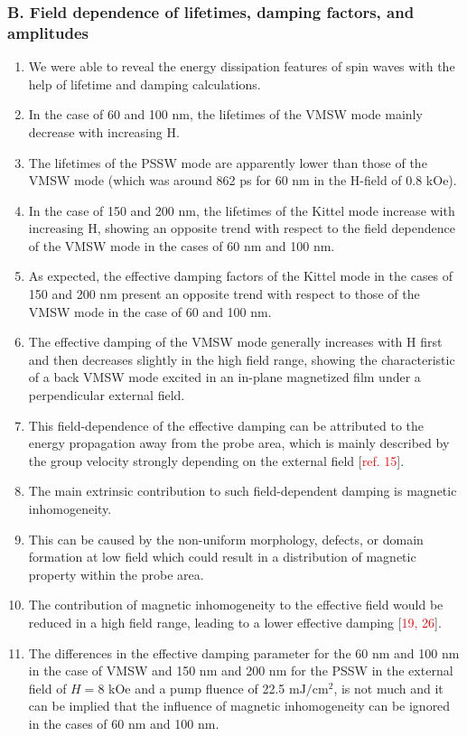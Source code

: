 \subsubsection*{B. Field dependence of lifetimes, damping factors, and amplitudes}
\begin{enumerate}
    \item We were able to reveal the energy dissipation features of spin waves with the help of lifetime and damping calculations.
    \item In the case of 60 and 100 nm, the lifetimes of the VMSW mode mainly decrease with increasing H.
    \item The lifetimes of the PSSW mode are apparently lower than those of the VMSW mode (which was around 862 ps for 60 nm in the H-field of 0.8 kOe).
    \item In the case of 150 and 200 nm, the lifetimes of the Kittel mode increase with increasing H, showing an opposite trend with respect to the field dependence of the VMSW mode in the cases of 60 nm and 100 nm.
    \item As expected, the effective damping factors of the Kittel mode in the cases of 150 and 200 nm present an opposite trend with respect to those of the VMSW mode in the case of 60 and 100 nm.
    \item The effective damping of the VMSW mode generally increases with H first and then decreases slightly in the high field range, showing the characteristic of a back VMSW mode excited in an in-plane magnetized film under a perpendicular external field.
    \item This field-dependence of the effective damping can be attributed to the energy propagation away from the probe area, which is mainly described by the group velocity strongly depending on the external field [\textcolor{red}{ref. 15}].
    \item The main extrinsic contribution to such field-dependent damping is magnetic inhomogeneity.
    \item This can be caused by the non-uniform morphology, defects, or domain formation at low field which could result in a distribution of magnetic property within the probe area.
    \item The contribution of magnetic inhomogeneity to the effective field would be reduced in a high field range, leading to a lower effective damping [\textcolor{red}{19, 26}].
    \item The differences in the effective damping parameter for the 60 nm and 100 nm in the case of VMSW and 150 nm and 200 nm for the PSSW in the external field of $H=8$ kOe and a pump fluence of 22.5 $\mathrm{mJ/cm^2}$, is not much and it can be implied that the influence of magnetic inhomogeneity can be ignored in the cases of 60 nm and 100 nm.

\end{enumerate}
